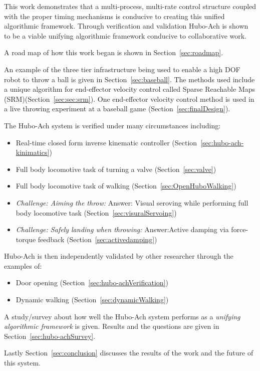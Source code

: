 This work demonstrates that a multi-process, multi-rate control structure coupled with the proper timing mechanisms is conducive to creating this unified algorithmic framework.
Through verification and validation Hubo-Ach is shown to be a viable unifying algorithmic framework conducive to collaborative work.  

A road map of how this work began is shown in Section~\ref{sec:roadmap}.

An example of the three tier infrastructure being used to enable a high DOF robot to throw a ball is given in Section~\ref{sec:baseball}.
The methods used include a unique algorithm for end-effector velocity control called Sparse Reachable Maps (SRM)(Section~\ref{sec:sec:srm}).
One end-effector velocity control method is used in a live throwing experiment at a baseball game (Section~\ref{sec:finalDesign}).

The Hubo-Ach system is verified under many circumstances including:
\begin{itemize}
	\item Real-time closed form inverse kinematic controller (Section~\ref{sec:hubo-ach-kinimatics})
	\item Full body locomotive task of turning a valve (Section~\ref{sec:valve})
	\item Full body locomotive task of walking (Section~\ref{sec:OpenHuboWalking})
	\item \textit{Challenge: Aiming the throw:} Answer: Visual seroving while performing full body locomotive task (Section~\ref{sec:visuralServoing})
	\item \textit{Challenge: Safely landing when throwing:} Answer:Active damping via force-torque feedback (Section~\ref{sec:activedamping})
\end{itemize}




Hubo-Ach is then independently validated by other researcher through the examples of:
\begin{itemize}
	\item Door opening (Section~\ref{sec:hubo-achVerification})
	\item Dynamic walking (Section~\ref{sec:dynamicWalking})
\end{itemize}


A study/survey about how well the Hubo-Ach system performs as a \textit{unifying algorithmic framework} is given.  
Results and the questions are given in Section~\ref{sec:hubo-achSurvey}.

Lastly Section~\ref{sec:conclusion} discusses the results of the work and the future of this system.

